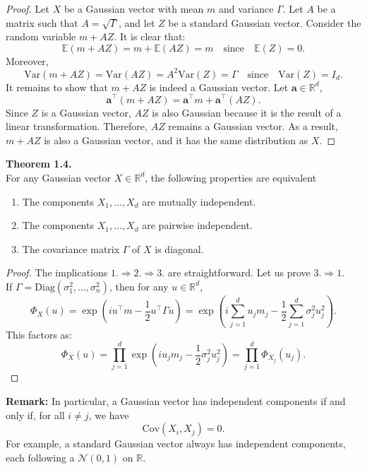 \documentclass[12pt]{article}
\begin{document}
\begin{proof}
Let $X$ be a Gaussian vector with mean $m$ and variance $\Gamma$.
Let $A$ be a matrix such that $A = \sqrt{\Gamma}$,
and let $Z$ be a standard Gaussian vector.
Consider the random variable $m + AZ$.
It is clear that:
\[
\mathbb{E}(m + AZ) = m + \mathbb{E}(AZ) = m \quad \text{since} \quad \mathbb{E}(Z) = 0.
\]
Moreover,
\[
\mathrm{Var}(m + AZ) = \mathrm{Var}(AZ) = A^2 \mathrm{Var}(Z) = \Gamma \quad \text{since} \quad \mathrm{Var}(Z) = I_d.
\]
It remains to show that $m + AZ$ is indeed a Gaussian vector.
Let $\mathbf{a} \in \mathbb{R}^d$,
\[
\mathbf{a}^\top (m + AZ) = \mathbf{a}^\top m + \mathbf{a}^\top (AZ).
\]
Since $Z$ is a Gaussian vector, $AZ$ is also Gaussian because it is the result of a linear transformation.
Therefore, $AZ$ remains a Gaussian vector.
As a result, $m + AZ$ is also a Gaussian vector, and it has the same distribution as $X$.
\end{proof}

\textbf{Theorem 1.4. }\\
For any Gaussian vector $X \in \mathbb{R}^d$, the following properties are equivalent
\begin{enumerate}
    \item The components $X_1, \dots, X_d$ are mutually independent.
    \item The components $X_1, \dots, X_d$ are pairwise independent.
    \item The covariance matrix $\Gamma$ of $X$ is diagonal.
\end{enumerate}

\begin{proof}
The implications $1. \Rightarrow 2. \Rightarrow 3.$ are straightforward. Let us prove $3. \Rightarrow 1.$ \\
If $\Gamma = \mathrm{Diag}(\sigma_1^2, \dots, \sigma_n^2)$, then for any $u \in \mathbb{R}^d$,
\[
\Phi_X(u) = \exp\!\left(i u^\top m - \frac{1}{2} u^\top \Gamma u\right)
= \exp\!\left(i \sum_{j=1}^d u_j m_j - \frac{1}{2} \sum_{j=1}^d \sigma_j^2 u_j^2 \right).
\]
This factors as:
\[
\Phi_X(u) = \prod_{j=1}^d \exp\!\left(i u_j m_j - \frac{1}{2} \sigma_j^2 u_j^2\right)
= \prod_{j=1}^d \Phi_{X_j}(u_j).
\]
\end{proof}

\vspace{0.3cm}

\textbf{Remark:}
In particular, a Gaussian vector has independent components if and only if, for all $i \neq j$, we have
\[
\mathrm{Cov}(X_i, X_j) = 0.
\]
For example, a standard Gaussian vector always has independent components, each following a $\mathcal{N}(0, 1)$ on $\mathbb{R}$.
\end{document}
